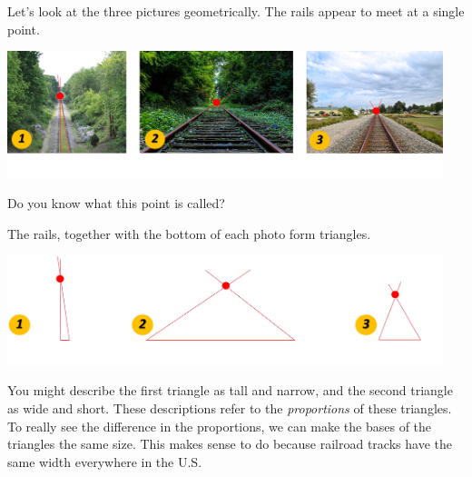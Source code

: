 \documentclass{ximera}
\begin{document}
\begin{exploration}\label{exp:trianglesAtBase}
    Let's look at the three pictures geometrically.  The rails appear to meet at a single point.  
    
\begin{image}
         \includegraphics[width=5in]{vanishingPoint.jpg}
\end{image}
    
    Do you know what this point is called?
    \begin{multipleChoice}
    \end{multipleChoice}

The rails, together with the bottom of each photo form triangles.  

\begin{image}
         \includegraphics[width=5in]{triangles.jpg}
\end{image}

You might describe the first triangle as tall and narrow, and the second triangle as wide and short.  These descriptions refer to the \emph{proportions} of these triangles.  To really see the difference in the proportions, we can make the bases of the triangles the same size.  This makes sense to do because railroad tracks have the same width everywhere in the U.S.


\end{exploration}
\end{document}
